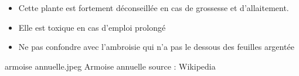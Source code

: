 {%
    \begin{itemize}[label = \bcplume]
        \item Cette plante est fortement déconseillée en cas de grossesse et d'allaitement.
        \item Elle est toxique en cas d'emploi prolongé
        \item Ne pas confondre avec l'ambroisie qui n'a pas le dessous des feuilles argentée
    \end{itemize}
}
{%
    armoise annuelle.jpeg
}
{%
    Armoise annuelle
}
{%
    source : Wikipedia 
}
